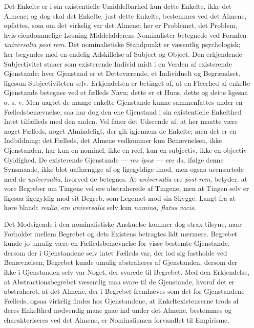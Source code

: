 \documentclass[11pt]{book}
\newcommand{\opage}[1]{\marginnote{\footnotesize\textit{[#1]}}}
\begin{document}
Det Enkelte er i sin existentielle Umiddelbarhed kun dette Enkelte,
ikke det Almene; og dog skal det Enkelte, just dette Enkelte, bestemmes
ved det Almene, opfattes, som om det virkelig var det Almene: her er
Problemet, det Problem, hvis eiendommelige Løsning Middelalderens
Nominalister betegnede ved Formlen \textit{universalia post rem}. Det
nominalistiske Standpunkt er væsentlig psychologisk; her begyndes med
en endelig Adskillelse af Subject og Object. Den erkjendende
Subjectivitet staaer som existerende Individ midt i en Verden af
existerende Gjenstande; hver Gjenstand er et Detteværende, et
Individuelt og Begrændset, ligesom Subjectiviteten selv.
\opage{194} \setcounter{footnote}{0}%
Erkjendelsen er betinget af, at en Fleerhed af enkelte Gjenstande
betegnes ved et fælleds Navn; dette er et Huus, dette og dette ligesaa
o. s. v. Men uagtet de mange enkelte Gjenstande kunne sammenfattes
under en Fælledsbenævnelse, saa har dog den ene Gjenstand i sin
existentielle Enkelthed Intet tilfælleds med den anden. Vel faaer det
Udseende af, at her maatte være noget Fælleds, noget Almindeligt, der
gik igjennem de Enkelte; men det er en Indbildning: det Fælleds, det
Almene vedkommer kun Benævnelsen, ikke Gjenstanden, har kun en nominel,
ikke en reel, kun en subjectiv, ikke en objectiv Gyldighed. De
existerende Gjenstande --- \textit{res ipsæ} --- ere da, ifølge denne
Synsmaade, ikke blot uafhængige af og ligegyldige imod, men ogsaa
ueensartede med de \textit{universalia}, hvorved de betegnes. At
\textit{universalia} ere \textit{post rem}, betyder, at vore Begreber
om Tingene vel ere abstraherede af Tingene, men at Tingen selv er
ligesaa ligegyldig mod sit Begreb, som Legemet mod sin Skygge. Langt
fra at høre blandt \textit{realia}, ere \textit{universalia} selv kun
\textit{nomina, flatus vocis}.

Det Modsigende i den nominalistiske Anskuelse kommer dog strax tilsyne,
naar Forholdet mellem Begrebet og dets Existens betragtes lidt nærmere.
Begrebet kunde jo umulig være en Fælledsbenævnelse for visse bestemte
Gjenstande, dersom der i Gjenstandene selv intet Fælleds var, der lod
sig fastholde ved Benævnelsen; Begrebet kunde umulig abstraheres af
Gjenstanden, dersom der ikke i Gjenstanden selv var Noget, der svarede
til Begrebet. Med den Erkjendelse, at Abstractionsbegrebet væsentlig
maa svare til de Gjenstande, hvoraf det er abstraheret, at det Almene,
der i Begrebet fremhæves som det for Gjenstandene Fælleds, ogsaa
virkelig findes hos Gjenstandene, at Enkeltexistenserne trods al deres
Enkelthed nødvendig maae gaae ind under det Almene, bestemmes og
charakteriseres ved det Almene, er Nominalismen forvandlet til
Empirisme.
\end{document}
